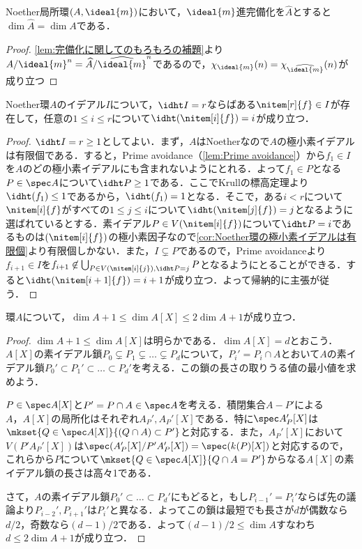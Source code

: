 \begin{thm}\label{thm:完備化の次元}
	Noether局所環$(A,\ideal{m})$において，$\ideal{m}$進完備化を$\widehat{A}$とすると$\dim\widehat{A}=\dim A$である．
\end{thm}

\begin{proof}
	\ref{lem:完備化に関してのもろもろの補題}より$A/\ideal{m}^n=\widehat{A}/{\widehat{\ideal{m}}}^n$であるので，$\chi_{\ideal{m}}(n)=\chi_{\widehat{\ideal{m}}}(n)$が成り立つ
\end{proof}

\begin{prop}\label{prop:イデアルの高さと生成系の個数}
	Noether環$A$のイデアル$I$について，$\idht I=r$ならばある$\nitem[r]{f}\in I$が存在して，任意の$1\leq i\leq r$について$\idht (\nitem[i]{f})=i$が成り立つ．
\end{prop}

\begin{proof}
	$\idht I=r\geq1$としてよい．まず，$A$はNoetherなので$A$の極小素イデアルは有限個である．すると，Prime avoidance（\ref{lem:Prime avoidance}）から$f_1\in I$を$A$のどの極小素イデアルにも含まれないようにとれる．よって$f_1\in P$となる$P\in\spec A$について$\idht P\geq1$である．ここでKrullの標高定理より$\idht (f_1)\leq1$であるから，$\idht (f_1)=1$となる．そこで，ある$i<r$について$\nitem[i]{f}$がすべての$1\leq j\leq i$について$\idht (\nitem[j]{f})=j$となるように選ばれているとする．素イデアル$P\in V(\nitem[i]{f})$について$\idht P=i$であるものは$(\nitem[i]{f})$の極小素因子なので\ref{cor:Noether環の極小素イデアルは有限個}より有限個しかない．また，$I\subsetneq P$であるので，Prime avoidanceより$f_{i+1}\in I$を$f_{i+1}\not\in\bigcup_{P\in V(\nitem[i]{j}),\idht P=j} P$となるようにとることができる．すると$\idht (\nitem[i+1]{f})=i+1$が成り立つ．よって帰納的に主張が従う．
\end{proof}

\begin{thm}
	環$A$について，$\dim A+1\leq\dim A[X]\leq 2\dim A+1$が成り立つ．
\end{thm}

\begin{proof}
	$\dim A+1\leq\dim A[X]$は明らかである．$\dim A[X]=d$とおこう．$A[X]$の素イデアル鎖$P_0\subsetneq P_1\subsetneq\dots\subsetneq P_d$について，$P_i'=P_i\cap A$とおいて$A$の素イデアル鎖$P_0'\subset P_1'\subset\dots\subset P_d'$を考える．この鎖の長さの取りうる値の最小値を求めよう．
	
	$P\in\spec A[X]$と$P'=P\cap A\in\spec A$を考える．積閉集合$A-P'$による$A，A[X]$の局所化はそれぞれ$A_P',A_P'[X]$である．特に$\spec A_P'[X]$は$\mkset{Q\in\spec A[X]}{(Q\cap A)\subset P'}$と対応する．また，$A_P'[X]$において$V(P'A_P'[X])$は$\spec (A_P'[X]/P'A_P'[X])=\spec (k(P)[X])$と対応するので，これらから$P$について$\mkset{Q\in\spec A[X]}{Q\cap A=P'}$からなる$A[X]$の素イデアル鎖の長さは高々1である．
	
	さて，$A$の素イデアル鎖$P_0'\subset\dots\subset P_d'$にもどると，もし$P_{i-1}'=P_i'$ならば先の議論より$P_{i-2}',P_{i+1}'$は$P_i'$と異なる．よってこの鎖は最短でも長さが$d$が偶数なら$d/2$，奇数なら$(d-1)/2$である．よって$(d-1)/2\leq \dim A$すなわち$d\leq 2\dim A+1$が成り立つ．
\end{proof}

